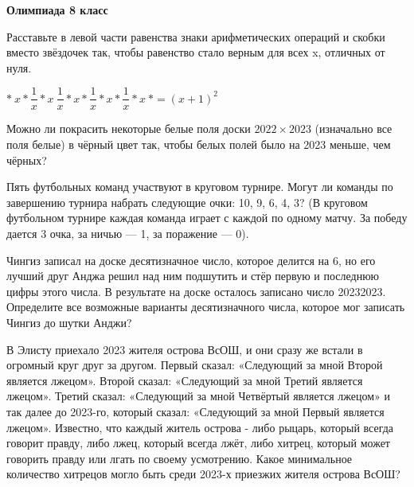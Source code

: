 \centerline{\bf \Huge Олимпиада 8 класс}
\centerline{\bf \Huge }

\begin{flushright}
        \scriptsize{}
\end{flushright}

Расставьте в левой части равенства знаки арифметических операций и скобки вместо звёздочек так, чтобы равенство стало верным для всех x, отличных от нуля.

$* \ x  * \dfrac{1}{x} * x \ \dfrac{1}{x} * x * \dfrac{1}{x} * x * \dfrac{1}{x} * x \ * = (x+1)^2$

\hspace{3mm}

 Можно ли покрасить некоторые белые поля доски $2022\times2023$ (изначально все поля белые) в чёрный цвет так, чтобы белых полей было на 2023 меньше, чем чёрных?

\hspace{3mm}

 Пять футбольных команд участвуют в круговом турнире. Могут ли команды по завершению турнира набрать следующие очки: 10, 9, 6, 4, 3? (В круговом футбольном турнире каждая команда играет с каждой по одному матчу. За победу дается 3 очка, за ничью — 1, за поражение — 0).

\hspace{3mm}

 Чингиз записал на доске десятизначное число, которое делится на 6, но его лучший друг Анджа решил над ним подшутить и стёр первую и последнюю цифры этого числа. В результате на доске осталось записано число 20232023. Определите все возможные варианты десятизначного числа, которое мог записать Чингиз до шутки Анджи?

\hspace{3mm}

В Элисту приехало 2023 жителя острова ВсОШ, и они сразу же встали в огромный круг друг за другом. Первый сказал: «Следующий за мной Второй является лжецом». Второй сказал: «Следующий за мной Третий является лжецом». Третий сказал: «Следующий за мной Четвёртый является лжецом» и так далее до 2023-го, который сказал: «Следующий за мной Первый является лжецом». Известно, что каждый житель острова - либо рыцарь, который всегда говорит правду, либо лжец, который всегда лжёт, либо хитрец, который может говорить правду или лгать по своему усмотрению. Какое минимальное количество хитрецов могло быть среди 2023-х приезжих жителя острова ВсОШ?
